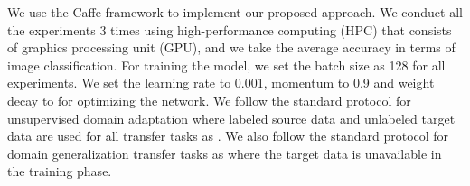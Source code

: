 \documentclass[review]{elsarticle}
\begin{document}
We use the Caffe \cite{jia2014caffe} framework to implement our proposed approach. We conduct all the experiments 3 times using high-performance computing (HPC) that consists of graphics processing unit (GPU), and we take the average accuracy in terms of image classification. For training the model, we set the batch size as 128 for all experiments. We set the learning rate to 0.001, momentum to 0.9 and weight decay to    for optimizing the network. We follow the standard protocol for unsupervised domain adaptation where labeled source data and unlabeled target data are used for all transfer tasks as \cite{pmlr-v37-ganin15}. We also follow the standard protocol for domain generalization transfer tasks as \cite{Li2018eccv} where the target data is unavailable in the training phase.
\end{document}
